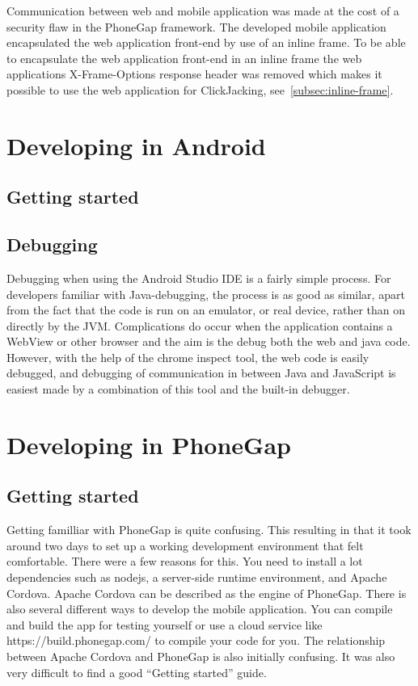 Communication between web and mobile application was made at the cost of a security flaw in the PhoneGap framework. The developed mobile application encapsulated the web application front-end by use of an inline frame. To be able to encapsulate the web application front-end in an inline frame the web applications X-Frame-Options response header was removed which makes it possible to use the web application for ClickJacking, see~\ref{subsec:inline-frame}. 

\iffalse
\section{Developing in Android}
\subsection{Getting started}
\subsection{Debugging}
Debugging when using the Android Studio IDE is a fairly simple process. For developers familiar with Java-debugging, the process is as good as similar, apart from the fact that the code is run on an emulator, or real device, rather than on directly by the JVM. Complications do occur when the application contains a WebView or other browser and the aim is the debug both the web and java code. However, with the help of the chrome inspect tool, the web code is easily debugged, and debugging of communication in between Java and JavaScript is easiest made by a combination of this tool and the built-in debugger. 
\section{Developing in PhoneGap}
\subsection{Getting started}
Getting familliar with PhoneGap is quite confusing. This resulting in that it took around two days to set up a working development environment that felt comfortable. There were a few reasons for this. You need to install a lot dependencies such as nodejs, a server-side runtime environment, and Apache Cordova. Apache Cordova can be described as the engine of PhoneGap. There is also several different ways to develop the mobile application. You can compile and build the app for testing yourself or use a cloud service like https://build.phonegap.com/ to compile your code for you. The relationship between Apache Cordova and PhoneGap is also initially confusing. It was also very difficult to find a good “Getting started” guide.

